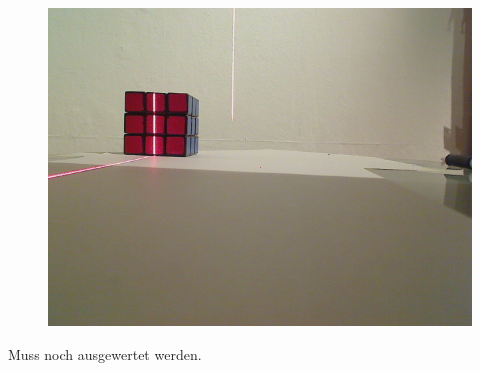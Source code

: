 \documentclass{beamer}
\begin{document}
\begin{frame}
\begin{figure}
\begin{minipage}{0.32\linewidth}
		\end{minipage}
		\hfill
		\begin{minipage}{0.32\linewidth}
			\includegraphics[width=\linewidth]{includes/test_repeat_3}
		\end{minipage}
	\end{figure}

	Muss noch ausgewertet werden.
	
\end{frame}
\end{document}
